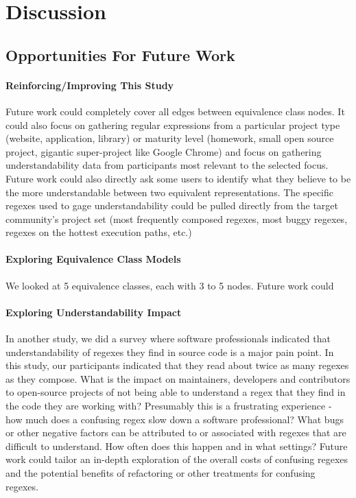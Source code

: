\section{Discussion}
\label{sec:discussion}
\subsection{Opportunities For Future Work}
\paragraph{Reinforcing/Improving This Study}
Future work could completely cover all edges between equivalence class nodes.  It could also focus on gathering regular expressions from a particular project type (website, application, library) or maturity level (homework, small open source project, gigantic super-project like Google Chrome) and focus on gathering understandability data from participants most relevant to the selected focus.  Future work could also directly ask some users to identify what they believe to be the more understandable between two equivalent representations.  The specific regexes used to gage understandability could be pulled directly from the target community's project set (most frequently composed regexes, most buggy regexes, regexes on the hottest execution paths, etc.)

\paragraph{Exploring Equivalence Class Models}
We looked at 5 equivalence classes, each with 3 to 5 nodes.  Future work could

\paragraph{Exploring Understandability Impact}
In another study, we did a survey where software professionals indicated that understandability of regexes they find in source code is a major pain point.  In this study, our participants indicated that they read about twice as many regexes as they compose.  What is the impact on maintainers, developers and contributors to open-source projects of not being able to understand a regex that they find in the code they are working with?  Presumably this is a frustrating experience - how much does a confusing regex slow down a software professional?  What bugs or other negative factors can be attributed to or associated with regexes that are difficult to understand.  How often does this happen and in what settings?  Future work could tailor an in-depth exploration of the overall costs of confusing regexes and the potential benefits of refactoring or other treatments for confusing regexes.

